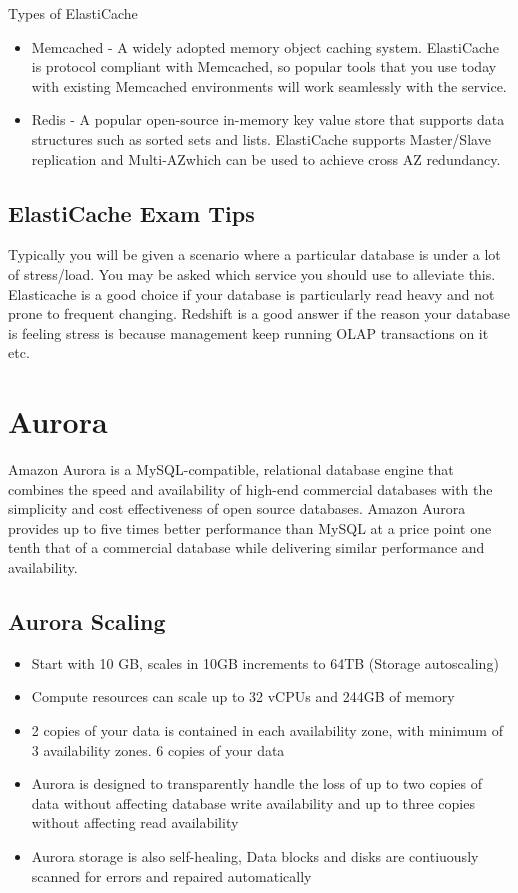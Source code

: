 \documentclass{article}
\begin{document}
Types of ElastiCache
\begin{itemize}
\item
Memcached - A widely adopted memory object caching system. ElastiCache is protocol compliant with Memcached, so popular tools that you use today with existing Memcached environments will work seamlessly with the service.

\item
Redis - A popular open-source in-memory key value store that supports data structures such as sorted sets and lists. ElastiCache supports Master/Slave replication and Multi-AZwhich can be used to achieve cross AZ redundancy.

\end{itemize}

\subsection{ElastiCache Exam Tips}
Typically you will be given a scenario where a particular database is under a lot of stress/load. You may be asked which service you should use to alleviate this. Elasticache is a good choice if your database is particularly read heavy and not prone to frequent changing. Redshift is a good answer if the reason your database is feeling stress is because management keep running OLAP transactions on it etc.

\section{Aurora}
Amazon Aurora is a MySQL-compatible, relational database engine that combines the speed and availability of high-end commercial databases with the simplicity and cost effectiveness of open source databases. Amazon Aurora provides up to five times better performance than MySQL at a price point one tenth that of a commercial database while delivering similar performance and availability.

\subsection{Aurora Scaling}
\begin{itemize}
\item
Start with 10 GB, scales in 10GB increments to 64TB (Storage autoscaling)

\item
Compute resources can scale up to 32 vCPUs and 244GB of memory

\item
2 copies of your data is contained in each availability zone, with minimum of 3 availability zones. 6 copies of your data

\item
Aurora is designed to transparently handle the loss of up to two copies of data without affecting database write availability and up to three copies without affecting read availability

\item
Aurora storage is also self-healing, Data blocks and disks are contiuously scanned for errors and repaired automatically

\end{itemize}
\end{document}
